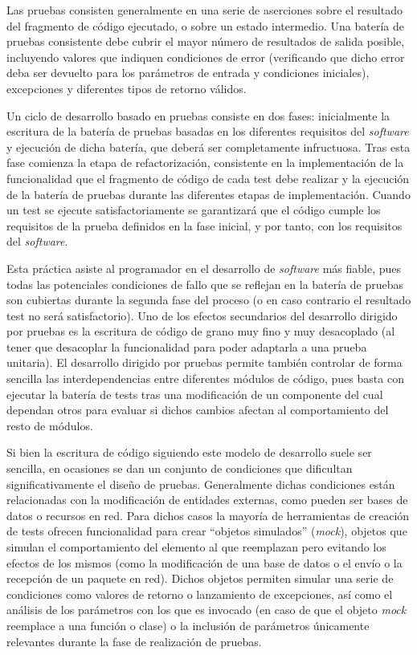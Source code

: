 Las pruebas consisten generalmente en una serie de aserciones sobre el resultado del fragmento de código ejecutado, o sobre un estado intermedio. Una batería de pruebas consistente debe cubrir el mayor número de resultados de salida posible, incluyendo valores que indiquen condiciones de error (verificando que dicho error deba ser devuelto para los parámetros de entrada y condiciones iniciales), excepciones y diferentes tipos de retorno válidos.

Un ciclo de desarrollo basado en pruebas consiste en dos fases: inicialmente la escritura de la batería de pruebas basadas en los diferentes requisitos del \textit{software} y ejecución de dicha batería, que deberá ser completamente infructuosa. Tras esta fase comienza la etapa de refactorización, consistente en la implementación de la funcionalidad que el fragmento de código de cada test debe realizar y la ejecución de la batería de pruebas durante las diferentes etapas de implementación. Cuando un test se ejecute satisfactoriamente se garantizará que el código cumple los requisitos de la prueba definidos en la fase inicial, y por tanto, con los requisitos del \textit{software}.

Esta práctica asiste al programador en el desarrollo de \textit{software} más fiable, pues todas las potenciales condiciones de fallo que se reflejan en la batería de pruebas son cubiertas durante la segunda fase del proceso (o en caso contrario el resultado test no será satisfactorio). Uno de los efectos secundarios del desarrollo dirigido por pruebas es la escritura de código de grano muy fino y muy desacoplado (al tener que desacoplar la funcionalidad para poder adaptarla a una prueba unitaria). El desarrollo dirigido por pruebas permite también controlar de forma sencilla las interdependencias entre diferentes módulos de código, pues basta con ejecutar la batería de tests tras una modificación de un componente del cual dependan otros para evaluar si dichos cambios afectan al comportamiento del resto de módulos.

Si bien la escritura de código siguiendo este modelo de desarrollo suele ser sencilla, en ocasiones se dan un conjunto de condiciones que dificultan significativamente el diseño de pruebas. Generalmente dichas condiciones están relacionadas con la modificación de entidades externas, como pueden ser bases de datos o recursos en red. Para dichos casos la mayoría de herramientas de creación de tests ofrecen funcionalidad para crear ``objetos simulados'' (\textit{mock}), objetos que simulan el comportamiento del elemento al que reemplazan pero evitando los efectos de los mismos (como la modificación de una base de datos o el envío o la recepción de un paquete en red). Dichos objetos permiten simular una serie de condiciones como valores de retorno o lanzamiento de excepciones, así como el análisis de los parámetros con los que es invocado (en caso de que el objeto \textit{mock} reemplace a una función o clase) o la inclusión de parámetros únicamente relevantes durante la fase de realización de pruebas.

